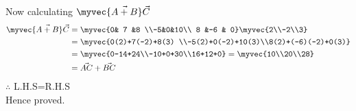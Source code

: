 \documentclass[journal,12pt,twocolumn]{IEEEtran}
\begin{document}
Now calculating $\myvec{\vec{A+B}}\vec{C}$
\begin{align}
\myvec{\vec{A+B}}\vec{C}&=\myvec{0& 7 &8 \\-5&0&10\\ 8 &-6 & 0}\myvec{2\\-2\\3}\\&=\myvec{0(2)+7(-2)+8(3)
\\-5(2)+0(-2)+10(3)\\8(2)+(-6)(-2)+0(3)}\\&=\myvec{0-14+24\\-10+0+30\\16+12+0}=\myvec{10\\20\\28}\\&=\vec{AC}+\vec{BC}
\end{align}
$\therefore$ L.H.S=R.H.S
\\
Hence proved.
\end{document}
